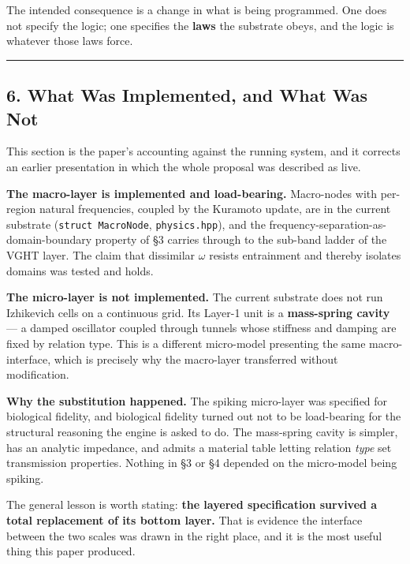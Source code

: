 \documentclass[
  11pt,
  a4paper,
]{article}
\begin{document}
The intended consequence is a change in what is being programmed. One
does not specify the logic; one specifies the \textbf{laws} the
substrate obeys, and the logic is whatever those laws force.

\begin{center}\rule{0.5\linewidth}{0.5pt}\end{center}

\subsection{6. What Was Implemented, and What Was
Not}\label{what-was-implemented-and-what-was-not}

This section is the paper's accounting against the running system, and
it corrects an earlier presentation in which the whole proposal was
described as live.

\textbf{The macro-layer is implemented and load-bearing.} Macro-nodes
with per-region natural frequencies, coupled by the Kuramoto update, are
in the current substrate (\texttt{struct\ MacroNode},
\texttt{physics.hpp}), and the frequency-separation-as-domain-boundary
property of §3 carries through to the sub-band ladder of the VGHT layer.
The claim that dissimilar \(\omega\) resists entrainment and thereby
isolates domains was tested and holds.

\textbf{The micro-layer is not implemented.} The current substrate does
not run Izhikevich cells on a continuous grid. Its Layer-1 unit is a
\textbf{mass-spring cavity} --- a damped oscillator coupled through
tunnels whose stiffness and damping are fixed by relation type. This is
a different micro-model presenting the same macro-interface, which is
precisely why the macro-layer transferred without modification.

\textbf{Why the substitution happened.} The spiking micro-layer was
specified for biological fidelity, and biological fidelity turned out
not to be load-bearing for the structural reasoning the engine is asked
to do. The mass-spring cavity is simpler, has an analytic impedance, and
admits a material table letting relation \emph{type} set transmission
properties. Nothing in §3 or §4 depended on the micro-model being
spiking.

The general lesson is worth stating: \textbf{the layered specification
survived a total replacement of its bottom layer.} That is evidence the
interface between the two scales was drawn in the right place, and it is
the most useful thing this paper produced.
\end{document}
